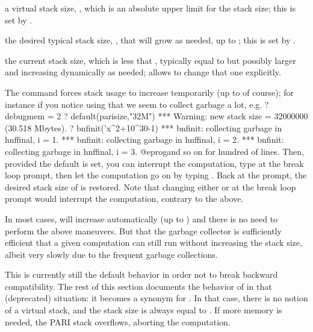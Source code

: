 \item a virtual stack size, , which is an absolute upper
limit for the stack size; this is set by .

\item the desired typical stack size, , that will grow as
needed, up to ; this is set by .

\item the current stack size, which is less that ,
typically equal to  but possibly larger and increasing
dynamically as needed;  allows to change that one
explicitly.

The  command forces stack
usage to increase temporarily (up to  of course); for
instance if you notice using  that we seem to collect garbage a
lot, e.g.
\bprog
? 
  debugmem = 2
? default(parisize,"32M")
 ***   Warning: new stack size = 32000000 (30.518 Mbytes).
? bnfinit('x^2+10^30-1)
 *** bnfinit: collecting garbage in hnffinal, i = 1.
 *** bnfinit: collecting garbage in hnffinal, i = 2.
 *** bnfinit: collecting garbage in hnffinal, i = 3.
@eprog\noindent and so on for hundred of lines. Then, provided the
 default is set, you can interrupt the computation, type
 at the break loop prompt, then let the
computation go on by typing . Back at the  prompt,
the desired stack size of  is restored. Note that changing either
 or  at the break loop prompt would interrupt
the computation, contrary to the above.

In most cases,  will increase automatically (up to
) and there is no need to perform the above maneuvers.
But that the garbage collector is sufficiently efficient that
a given computation can still run without increasing the stack size,
albeit very slowly due to the frequent garbage collections.

This is currently still the default behavior in order not to break backward
compatibility. The rest of this section documents the
behavior of  in that (deprecated) situation: it becomes a
synonym for . In that case, there is no
notion of a virtual stack, and the stack size is always equal to
. If more memory is needed, the PARI stack overflows, aborting
the computation.

